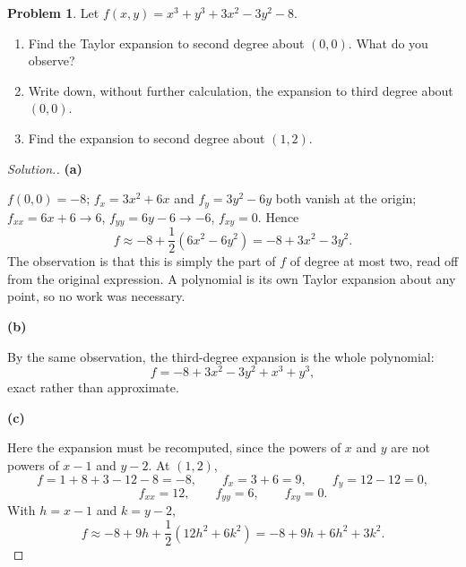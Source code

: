\documentclass[11pt,a4paper]{article}
\theoremstyle{definition}
\newtheorem{problemx}{Problem}[subsection]
\newenvironment{problem}{\begin{problemx}}{\end{problemx}}
\newenvironment{solution}
  {\renewcommand{\qedsymbol}{}\begin{proof}[\textit{Solution}.]}
  {\end{proof}}
\newcommand{\subhead}[1]{%
  \par\medskip\noindent\textbf{#1}\par\nobreak\smallskip}
\begin{document}
\begin{problem}
Let $f(x,y) = x^3+y^3+3x^2-3y^2-8$.
\begin{enumerate}
\item[(a)] Find the Taylor expansion to second degree about $(0,0)$. What do you
observe?
\item[(b)] Write down, without further calculation, the expansion to third
degree about $(0,0)$.
\item[(c)] Find the expansion to second degree about $(1,2)$.
\end{enumerate}
\end{problem}
\begin{solution}
\subhead{(a)}
$f(0,0) = -8$; $f_x = 3x^2+6x$ and $f_y = 3y^2-6y$ both vanish at the origin;
$f_{xx} = 6x+6\rightarrow 6$, $f_{yy} = 6y-6\rightarrow -6$, $f_{xy} = 0$.
Hence
\[f \approx -8 + \frac12(6x^2 - 6y^2) = -8 + 3x^2 - 3y^2 .\]
The observation is that this is simply the part of $f$ of degree at most two,
read off from the original expression. A polynomial is its own Taylor
expansion about any point, so no work was necessary.

\subhead{(b)}
By the same observation, the third-degree expansion is the whole polynomial:
\[f = -8 + 3x^2 - 3y^2 + x^3 + y^3 ,\]
exact rather than approximate.

\subhead{(c)}
Here the expansion must be recomputed, since the powers of $x$ and $y$ are not
powers of $x-1$ and $y-2$. At $(1,2)$,
\[f = 1+8+3-12-8 = -8,\qquad f_x = 3+6 = 9,\qquad f_y = 12-12 = 0,\]
\[f_{xx} = 12,\qquad f_{yy} = 6,\qquad f_{xy} = 0 .\]
With $h = x-1$ and $k = y-2$,
\[f \approx -8 + 9h + \frac12(12h^2 + 6k^2) = -8 + 9h + 6h^2 + 3k^2 .\]
\end{solution}
\end{document}
